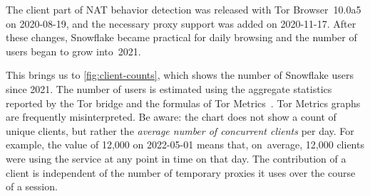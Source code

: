 \documentclass[letterpaper,twocolumn]{article}
\begin{document}
The client part of NAT behavior detection
was released with Tor Browser~10.0a5 on \mbox{2020-08-19},
and the necessary proxy support was added on \mbox{2020-11-17}.
After these changes, Snowflake became practical for daily browsing
and the number of users began to grow into~2021.

This brings us to \autoref{fig:client-counts}, which
shows the number of Snowflake users since 2021.
The number of users is estimated using the aggregate statistics
reported by the Tor bridge
and the formulas of Tor Metrics~\cite{tor-tr-2012-10-001}.
Tor Metrics graphs are frequently misinterpreted.
Be aware: the chart does not show a count of unique clients,
but rather the \emph{average number of concurrent clients} per day.
For example, the value of 12,000 on \mbox{2022-05-01}
means that, on~average, 12,000 clients were using the service
at any point in time on that day.
The contribution of a client is independent of
the number of temporary proxies it uses
over the course of a session.
\end{document}
